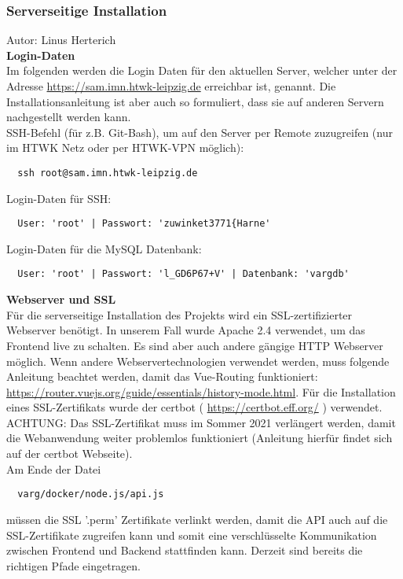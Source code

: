 \documentclass[twoside]{report}
\begin{document}
\subsubsection{Serverseitige Installation}
{\small Autor: Linus Herterich}
\\
\textbf{Login-Daten}
\\Im folgenden werden die Login Daten für den aktuellen Server, welcher unter der Adresse \url{https://sam.imn.htwk-leipzig.de} 
erreichbar ist, genannt. Die Installationsanleitung ist aber auch so formuliert, dass sie auf anderen Servern 
nachgestellt werden kann.
\\SSH-Befehl (für z.B. Git-Bash), um auf den Server per Remote zuzugreifen (nur im HTWK Netz oder per HTWK-VPN möglich):
\begin{verbatim}
  ssh root@sam.imn.htwk-leipzig.de
\end{verbatim}
Login-Daten für SSH:
\begin{verbatim}
  User: 'root' | Passwort: 'zuwinket3771{Harne'
\end{verbatim}
Login-Daten für die MySQL Datenbank:
\begin{verbatim}
  User: 'root' | Passwort: 'l_GD6P67+V' | Datenbank: 'vargdb'
\end{verbatim}
\textbf{Webserver und SSL}
\\Für die serverseitige Installation des Projekts wird ein SSL-zertifizierter Webserver benötigt.
In unserem Fall wurde Apache 2.4 verwendet, um das Frontend live zu schalten. Es sind aber auch andere
gängige HTTP Webserver möglich. Wenn andere Webservertechnologien verwendet werden, muss folgende
Anleitung beachtet werden, damit das Vue-Routing funktioniert: \url{https://router.vuejs.org/guide/essentials/history-mode.html}.
Für die Installation eines SSL-Zertifikats wurde der certbot ( \url{https://certbot.eff.org/} ) verwendet. 
\\ACHTUNG: Das SSL-Zertifikat muss im Sommer 2021 verlängert werden, damit die Webanwendung weiter problemlos funktioniert 
(Anleitung hierfür findet sich auf der certbot Webseite).
\\Am Ende der Datei \begin{verbatim}
  varg/docker/node.js/api.js
\end{verbatim}
müssen die SSL '.perm' Zertifikate verlinkt werden, damit die API auch auf die SSL-Zertifikate zugreifen kann
und somit eine verschlüsselte Kommunikation zwischen Frontend und Backend stattfinden kann.
Derzeit sind bereits die richtigen Pfade eingetragen.
\\\\
\end{document}
